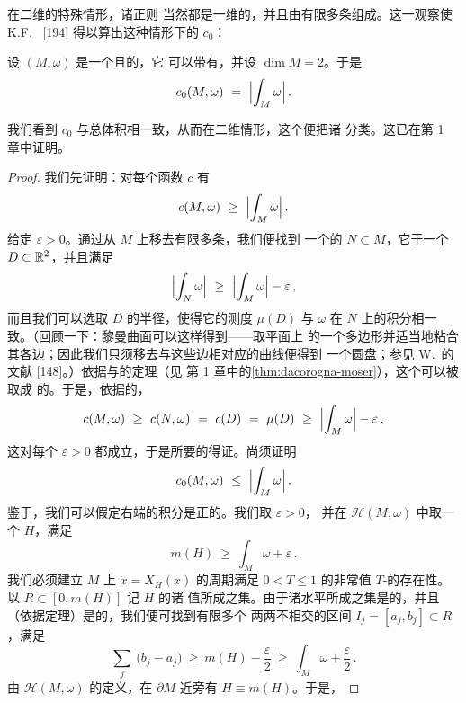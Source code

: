 在二维\trCompact\trSymplecticManifold{}的特殊情形，诸正则\trEnergySurface{}%
当然都是一维的，并且由有限多条\trPeriodicOrbit{}组成。这一观察使 K.F.~\trSiburg{}%
[194] 得以算出这种情形下的\trCapacity{} $c_{0}$：

\begin{theorem}[K.F.~\trSiburg]\label{thm:siburg-c0-dim2}
设 $(M,\omega)$ 是一个\trCompact{}且\trConnected{}的\trSymplecticManifold，它%
可以带有\trBoundary，并设 $\dim M=2$。于是
\[
c_{0}(M,\omega)\ =\ \Bigl|\int_{M}\omega\Bigr|\,.
\]
\end{theorem}

我们看到 $c_{0}$ 与总体积相一致，从而在二维情形，这个\trInvariant{}便把诸%
\trSymplectic\trDiffeomorphic\trManifold{}分类。这已在第 1 章中证明。

\begin{proof}
我们先证明：对每个\trCapacity{}函数 $c$ 有
\[
c(M,\omega)\ \geq\ \Bigl|\int_{M}\omega\Bigr|\,.
\]
给定 $\varepsilon>0$。通过从 $M$ 上移去有限多条\trCompact\trCurve，我们便找到%
一个\trSimplyConnected{}的\trManifold{} $N\subset M$，它\trDiffeomorphic{}于一个%
\trClosed\trDisc{} $D\subset\mathbb{R}^{2}$，并且满足
\[
\Bigl|\int_{N}\omega\Bigr|\ \geq\ \Bigl|\int_{M}\omega\Bigr|-\varepsilon\,,
\]
而且我们可以选取\trDisc{} $D$ 的半径，使得它的\trLebesgue{}测度 $\mu(D)$ 与%
$\omega$ 在 $N$ 上的积分相一致。（回顾一下：黎曼曲面可以这样得到——取平面上%
的一个多边形并适当地粘合其各边；因此我们只须移去与这些边相对应的曲线便得到%
一个圆盘；参见 W.~\trMassey{}的文献 [148]。）依据\trDacorogna{}与\trMoser{}的定理（见%
第 1 章中的\cref{thm:dacorogna-moser}），这个\trDiffeomorphism{}可以被取成%
\trSymplectic{}的。于是，依据\trCapacity{}的\trMonotonicity，
\[
c(M,\omega)\ \geq\ c(N,\omega)\ =\ c(D)\ =\ \mu(D)\ \geq\ \Bigl|\int_{M}\omega\Bigr|-\varepsilon\,.
\]
这对每个 $\varepsilon>0$ 都成立，于是所要的\trEstimate{}得证。尚须证明
\[
c_{0}(M,\omega)\ \leq\ \Bigl|\int_{M}\omega\Bigr|\,.
\]
鉴于\trConformality，我们可以假定右端的积分是正的。我们取 $\varepsilon>0$，%
并在 $\mathcal{H}(M,\omega)$ 中取一个 $H$，满足
\[
m(H)\ \geq\ \int_{M}\omega+\varepsilon\,.
\]
我们必须建立 $M$ 上 $\dot{x}=X_H(x)$ 的周期满足 $0<T\leq1$ 的非常值%
$T$-\trPeriodicSolution{}的存在性。以 $R\subset[0,m(H)]$ 记 $H$ 的诸%
\trRegular{}值所成之集。由于诸\trCritical{}水平所成之集是\trCompact{}的，并且%
（依据\trSard{}定理）是\trLebesgue{}\trMeasureZero{}的，我们便可找到有限多个%
两两不相交的区间 $I_{j}=[a_{j},b_{j}]\subset R$，满足
\[
\sum_{j}\ \bigl(b_{j}-a_{j}\bigr)\ \geq\ m(H)-\frac{\varepsilon}{2}\ \geq\ \int_{M}\omega+\frac{\varepsilon}{2}\,.
\]
由 $\mathcal{H}(M,\omega)$ 的定义，在 $\partial M$ 近旁有 $H\equiv m(H)$。于是，%

\end{proof}
